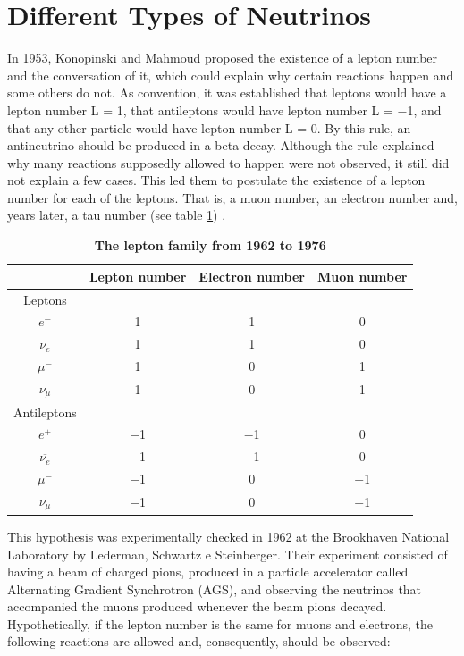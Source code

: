 \section{Different Types of Neutrinos}
In 1953, Konopinski  and Mahmoud proposed the existence of a lepton number and the conversation of it, which could explain why certain reactions happen and some others do not. As convention, it was established that leptons would have a lepton number L = 1, that antileptons would have lepton number L = $-$1, and that any other particle would have lepton number L = 0. By this rule, an antineutrino should be produced in a beta decay. Although the rule explained why many reactions supposedly allowed to happen were not observed, it still did not explain a few cases. This led them to postulate the existence of a lepton number for each of the leptons. That is, a muon number, an electron number and, years later, a tau number (see table \ref{lepton_family}) \cite{Konopinski_Mahmoud}. 
%
\begin{table}
	\begin{center}
		\begin{tabular}{cccc}
			\bottomrule
						& \textbf{Lepton number}	&	\textbf{Electron number}	&	\textbf{Muon number}\\
			\toprule
			Leptons			&		&		&	 \\
			$e^-$			&	1	&	1	&	0\\ 
			$\nu_e$			&	1	&	1	&	0\\
			$\mu^-$			&	1	&	0	&	1\\	
			$\nu_\mu$		&	1	&	0	&	1\\
			Antileptons		&		&		&	  \\
			$e^+$			&	$-$1	&	$-$1	&	0\\	
			$\overline{\nu_e}$	&	$-$1	&	$-$1	&	0\\
			$\mu^-$			&	$-$1	&	0	&	$-$1\\
			$\nu_\mu$		&	$-$1	&	0	&	$-$1\\
			\toprule
		\end{tabular}
		\caption[The lepton family]{{\textbf{The lepton family from 1962 to 1976}} \cite{griffiths}}
		\label{lepton_family}
	\end{center}
\end{table}
\newline

This hypothesis was experimentally checked in 1962 at the Brookhaven National Laboratory by Lederman, Schwartz e Steinberger. Their experiment consisted of having a beam of charged pions, produced in a particle accelerator called Alternating Gradient Synchrotron (AGS), and observing the neutrinos that accompanied the muons produced whenever the beam pions decayed. Hypothetically, if the lepton number is the same for muons and electrons, the following reactions are allowed and, consequently, should be observed: 

